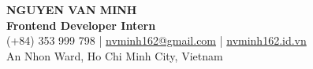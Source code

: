 \begin{center}
    {\fontsize{25}{28}\selectfont\bfseries NGUYEN VAN MINH}\\[4pt]
    {\large\bfseries Frontend Developer Intern}\\[6pt]
    (+84) 353 999 798 \;|\; \href{mailto:nvminh162@gmail.com}{nvminh162@gmail.com} \;|\; \href{https://nvminh162.id.vn}{nvminh162.id.vn}\\[3pt]
    An Nhon Ward, Ho Chi Minh City, Vietnam
    \\ \vspace{-1pt}
\end{center}
